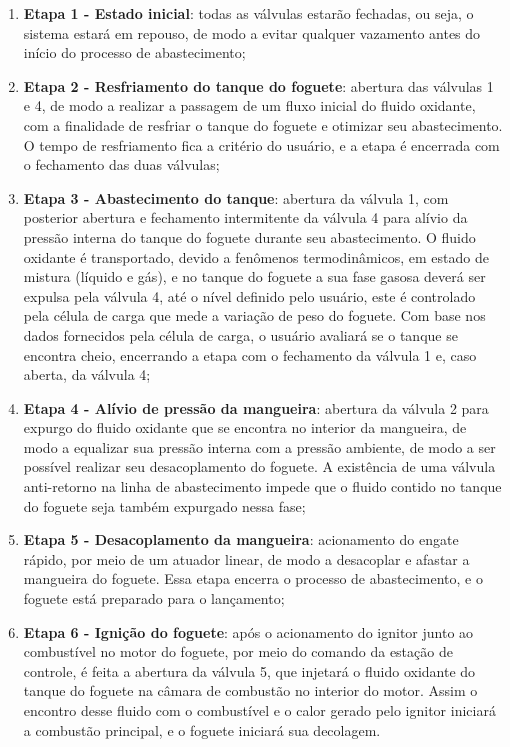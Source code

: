 \begin{enumerate}
    \item \textbf{Etapa 1 - Estado inicial}: todas as válvulas estarão fechadas, ou seja, o sistema estará em repouso, de modo a evitar qualquer vazamento antes do início do processo de abastecimento; 
    
    \item \textbf{Etapa 2 - Resfriamento do tanque do foguete}: abertura das válvulas 1 e 4, de modo a realizar a passagem de um fluxo inicial do fluido oxidante, com a finalidade de resfriar o tanque do foguete e otimizar seu abastecimento. O tempo de resfriamento fica a critério do usuário, e a etapa é encerrada com o fechamento das duas válvulas;
    
    \item \textbf{Etapa 3 - Abastecimento do tanque}: abertura da válvula 1, com posterior abertura e fechamento intermitente da válvula 4 para alívio da pressão interna do tanque do foguete durante seu abastecimento. O fluido oxidante é transportado, devido a fenômenos termodinâmicos, em estado de mistura (líquido e gás), e no tanque do foguete a sua fase gasosa deverá ser expulsa pela válvula 4, até o nível definido pelo usuário, este é controlado pela célula de carga que mede a variação de peso do foguete. Com base nos dados fornecidos pela célula de carga, o usuário avaliará se o tanque se encontra cheio, encerrando a etapa com o fechamento da válvula 1 e, caso aberta, da válvula 4; 
    \item \textbf{Etapa 4 - Alívio de pressão da mangueira}: abertura da válvula 2 para expurgo do fluido oxidante que se encontra no interior da mangueira, de modo a equalizar sua pressão interna com a pressão ambiente, de modo a ser possível realizar seu desacoplamento do foguete. A existência de uma válvula anti-retorno na linha de abastecimento impede que o fluido contido no tanque do foguete seja também expurgado nessa fase; 
    \item \textbf{Etapa 5 - Desacoplamento da mangueira}: acionamento do engate rápido, por meio de um atuador linear, de modo a desacoplar e afastar a mangueira do foguete. Essa etapa encerra o processo de abastecimento, e o foguete está preparado para o lançamento; 
    \item \textbf{Etapa 6 - Ignição do foguete}: após o acionamento do ignitor junto ao combustível no motor do foguete, por meio do comando da estação de controle, é feita a abertura da válvula 5, que injetará o fluido oxidante do tanque do foguete na câmara de combustão no interior do motor. Assim o encontro desse fluido com o combustível e o calor gerado pelo ignitor iniciará a combustão principal, e o foguete iniciará sua decolagem.
\end{enumerate}


